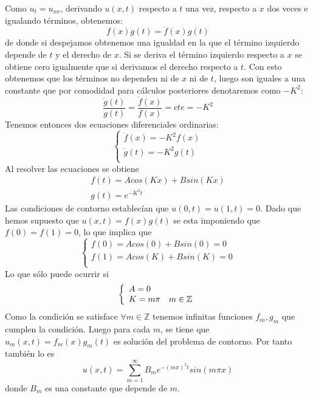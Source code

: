 Como $u_t = u_{xx}$, derivando $u(x,t)$ respecto a $t$ una vez, respecto a $x$ dos veces e igualando términos, obtenemos:
$$f(x) \dot{g}(t) = \ddot{f}(x) g(t)$$
de donde si despejamos obtenemos una igualdad en la que el término izquierdo depende de $t$ y el derecho de $x$. Si se deriva el término izquierdo respecto a $x$ se obtiene cero igualmente que si derivamos el derecho respecto a $t$. Con esto obtenemos que los términos no dependen ni de $x$ ni de $t$, luego son iguales a una constante que por comodidad para cálculos posteriores denotaremos como $-K^2$:
$$\frac{\dot{g}(t)}{g(t)} = \frac{\ddot{f}(x)}{f(x)} = cte = -K^2$$
Tenemos entonces dos ecuaciones diferenciales ordinarias:
\begin{equation*}
	\left\{
	\begin{array}{l}
		\ddot{f}(x) = -K^2 f(x)\\
		\dot{g}(t) = -K^2 g(t)\\
	\end{array}
	\right.
\end{equation*}
Al resolver las ecuaciones se obtiene
\begin{equation*}
	\begin{array}{l}
		f(t) = Acos(Kx) + Bsin(Kx)\\
		g(t) = e^{-K^2 t}
	\end{array}
\end{equation*}
Las condiciones de contorno establecían que $u(0,t) = u(1,t) = 0$. 
Dado que hemos supuesto que $u(x,t) = f(x)g(t)$ se esta imponiendo que $f(0) = f(1) = 0$, lo que implica que
\begin{equation*}
	\left\{
	\begin{array}{l}
		f(0) = Acos(0) + Bsin(0) = 0\\
		f(1) = Acos(K) + Bsin(K) = 0\\
	\end{array}
	\right.
\end{equation*}
Lo que sólo puede ocurrir si
\begin{equation*}
	\left\{
	\begin{array}{l l}
		A = 0 & \\
		K = m\pi & m\in\mathbb{Z}\\
	\end{array}
	\right.
\end{equation*}
Como la condición se satisface $\forall m \in \mathbb{Z}$ tenemos infinitas funciones $f_m, g_m$ que cumplen la condición. Luego para cada $m$, se tiene que $u_m(x,t) = f_m(x)g_m(t)$ es solución del problema de contorno.
Por tanto también lo es
$$u(x,t) = \sum_{m=1}^\infty B_m e^{-(m\pi)^2 t} sin(m\pi x)$$
donde $B_m$ es una constante que depende de $m$.

